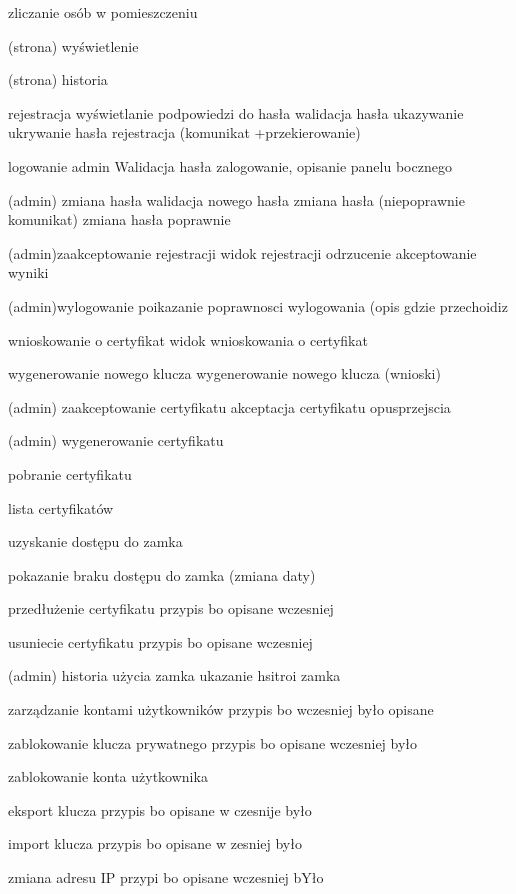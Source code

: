 \begin{enumerate*}
	\item zliczanie osób w pomieszczeniu
	\item (strona) wyświetlenie
	\item (strona) historia
	\item rejestracja
	wyświetlanie podpowiedzi do hasła
	walidacja hasła 
	ukazywanie ukrywanie hasła
	rejestracja (komunikat +przekierowanie)
	\item logowanie admin
	Walidacja hasła 
	zalogowanie, 
	opisanie panelu bocznego
	\item (admin) zmiana hasła
	walidacja nowego hasła
	zmiana hasła (niepoprawnie komunikat)
	zmiana hasła poprawnie
	\item (admin)zaakceptowanie rejestracji
	widok rejestracji odrzucenie 
	akceptowanie wyniki
	\item (admin)wylogowanie
	poikazanie poprawnosci wylogowania (opis gdzie przechoidiz
	\item wnioskowanie o certyfikat
	widok wnioskowania o certyfikat
	 
	\item wygenerowanie nowego klucza
	wygenerowanie nowego klucza (wnioski) 
	\item (admin) zaakceptowanie certyfikatu
	akceptacja certyfikatu opusprzejscia
	\item (admin) wygenerowanie certyfikatu
	\item  pobranie certyfikatu
	\item lista certyfikatów 
	\item uzyskanie dostępu do zamka
	\item  pokazanie braku dostępu do zamka (zmiana daty)
	\item przedłużenie certyfikatu
	przypis bo opisane wczesniej
	\item usuniecie certyfikatu
	przypis bo opisane wczesniej
	\item (admin) historia użycia zamka
	ukazanie hsitroi zamka
	\item  zarządzanie kontami użytkowników
	przypis bo wczesniej było opisane
	\item zablokowanie klucza prywatnego
	przypis bo opisane wczesniej było
	\item zablokowanie konta użytkownika
	\item  eksport klucza
	przypis bo opisane w czesnije było
	\item import klucza
	przypis bo opisane w zesniej było
	\item zmiana adresu IP
	przypi bo opisane wczesniej bYło
\end{enumerate*}
